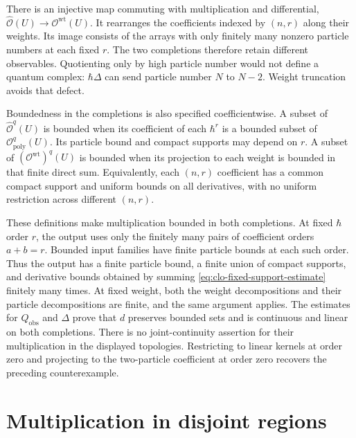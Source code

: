 There is an injective map commuting with multiplication and differential,
$\widehat{\mathscr O}(U)\to\mathscr O^{\mathrm{wt}}(U)$.
It rearranges the coefficients indexed by $(n,r)$ along their weights.
Its image consists of the arrays with only finitely many nonzero
particle numbers at each fixed $r$.
The two completions therefore retain different observables.
Quotienting only by high particle number would not define a quantum
complex: $\hbar\Delta$ can send particle number $N$ to $N-2$.
Weight truncation avoids that defect.

Boundedness in the completions is also specified coefficientwise.
A subset of $\widehat{\mathscr O}^{q}(U)$ is bounded when its
coefficient of each $\hbar^r$ is a bounded subset of
$\mathscr O_{\mathrm{poly}}^{q}(U)$.
Its particle bound and compact supports may depend on $r$.
A subset of $(\mathscr O^{\mathrm{wt}})^q(U)$ is bounded when its
projection to each weight is bounded in that finite direct sum.
Equivalently, each $(n,r)$ coefficient has a common compact support
and uniform bounds on all derivatives, with no uniform restriction
across different $(n,r)$.

These definitions make multiplication bounded in both completions.
At fixed $\hbar$ order $r$, the output uses only the finitely many
pairs of coefficient orders $a+b=r$.
Bounded input families have finite particle bounds at each such order.
Thus the output has a finite particle bound, a finite union of compact
supports, and derivative bounds obtained by summing
\eqref{eq:clo-fixed-support-estimate} finitely many times.
At fixed weight, both the weight decompositions and their particle
decompositions are finite, and the same argument applies.
The estimates for $Q_{\mathrm{obs}}$ and $\Delta$ prove that $d$
preserves bounded sets and is continuous and linear on both completions.
There is no joint-continuity assertion for their multiplication in the
displayed topologies. Restricting to linear kernels at order zero and
projecting to the two-particle coefficient at order zero recovers the
preceding counterexample.

\section{Multiplication in disjoint regions}
\label{sec:clo-disjoint-products}

